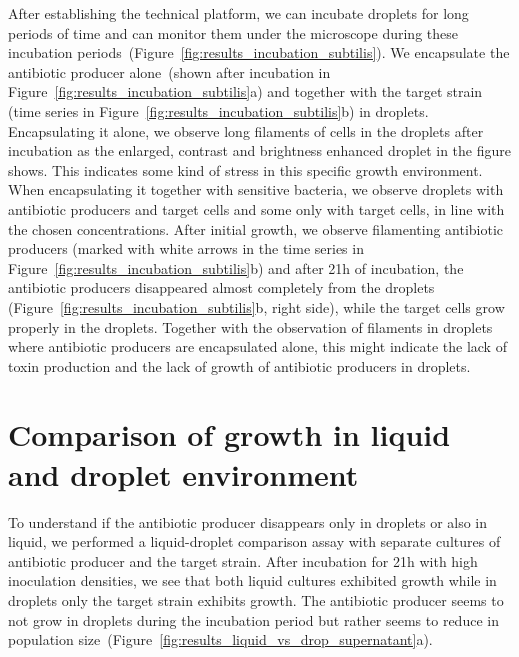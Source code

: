 After establishing the technical platform, we can incubate droplets for long periods of time and can monitor them under the microscope during these incubation periods~(Figure~\ref{fig:results_incubation_subtilis}). We encapsulate the antibiotic producer alone~(shown after incubation in Figure~\ref{fig:results_incubation_subtilis}a) and together with the target strain (time series in Figure~\ref{fig:results_incubation_subtilis}b) in droplets. Encapsulating it alone, we observe long filaments of cells in the droplets after incubation as the enlarged, contrast and brightness enhanced droplet in the figure shows. This indicates some kind of stress in this specific growth environment. When encapsulating it together with sensitive bacteria, we observe droplets with antibiotic producers and target cells and some only with target cells, in line with the chosen concentrations. After initial growth, we observe filamenting antibiotic producers (marked with white arrows in the time series in Figure~\ref{fig:results_incubation_subtilis}b) and after 21h of incubation, the antibiotic producers disappeared almost completely from the droplets (Figure~\ref{fig:results_incubation_subtilis}b, right side), while the target cells grow properly in the droplets. Together with the observation of filaments in droplets where antibiotic producers are encapsulated alone, this might indicate the lack of toxin production and the lack of growth of antibiotic producers in droplets.

\section{Comparison of growth in liquid and droplet environment}
To understand if the antibiotic producer disappears only in droplets or also in liquid, we performed a liquid-droplet comparison assay with separate cultures of antibiotic producer and the target strain. After incubation for 21h with high inoculation densities, we see that both liquid cultures exhibited growth while in droplets only the target strain exhibits growth. The antibiotic producer seems to not grow in droplets during the incubation period but rather seems to reduce in population size~(Figure~\ref{fig:results_liquid_vs_drop_supernatant}a).

